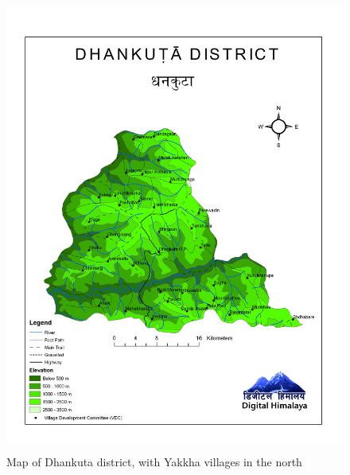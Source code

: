 \begin{figure}
\centering
\includegraphics[height=15cm]{figures/district_dhankuta_everything.png}
\caption{Map of Dhankuta district, with Yakkha villages in the north \citep{Joshi_Nepal_maps}}\label{map-dhan}
\end{figure}

